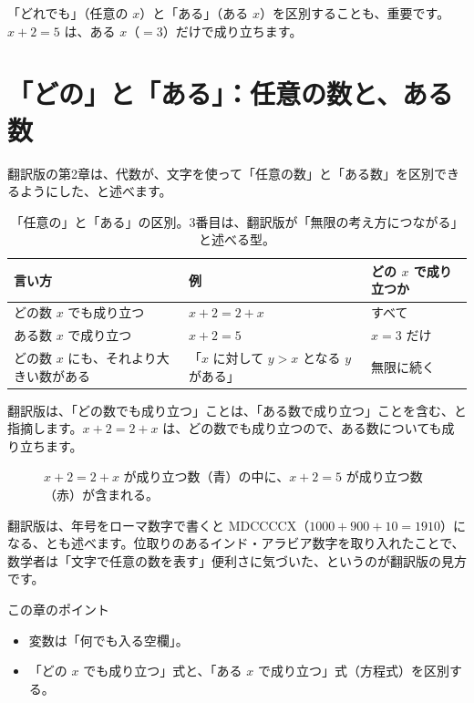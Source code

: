 \documentclass[a4paper,11pt,openany]{ltjsbook}
\begin{document}
「どれでも」（任意の $x$）と「ある」（ある $x$）を区別することも、重要です。$x+2=5$ は、ある $x$（$=3$）だけで成り立ちます。


\section{「どの」と「ある」：任意の数と、ある数}

翻訳版の第2章は、代数が、文字を使って「任意の数」と「ある数」を区別できるようにした、と述べます。

\begin{table}[htbp]
\centering
\begin{tabular}{p{4.6cm}p{4.6cm}p{3.2cm}}
\toprule
言い方 & 例 & どの $x$ で成り立つか\\
\midrule
どの数 $x$ でも成り立つ & $x+2=2+x$ & すべて\\
ある数 $x$ で成り立つ & $x+2=5$ & $x=3$ だけ\\
どの数 $x$ にも、それより大きい数がある & 「$x$ に対して $y>x$ となる $y$ がある」 & 無限に続く\\
\bottomrule
\end{tabular}
\caption{「任意の」と「ある」の区別。3番目は、翻訳版が「無限の考え方につながる」と述べる型。}
\end{table}

翻訳版は、「どの数でも成り立つ」ことは、「ある数で成り立つ」ことを含む、と指摘します。$x+2=2+x$ は、どの数でも成り立つので、ある数についても成り立ちます。

\begin{figure}[htbp]
\centering
{}
\caption{$x+2=2+x$ が成り立つ数（青）の中に、$x+2=5$ が成り立つ数（赤）が含まれる。}
\end{figure}

翻訳版は、年号をローマ数字で書くと MDCCCCX（$1000+900+10=1910$）になる、とも述べます。位取りのあるインド・アラビア数字を取り入れたことで、数学者は「文字で任意の数を表す」便利さに気づいた、というのが翻訳版の見方です。

\begin{pointbox}{この章のポイント}
\begin{itemize}[leftmargin=1.5em]
\item 変数は「何でも入る空欄」。
\item 「どの $x$ でも成り立つ」式と、「ある $x$ で成り立つ」式（方程式）を区別する。
\end{itemize}
\end{pointbox}
\end{document}
